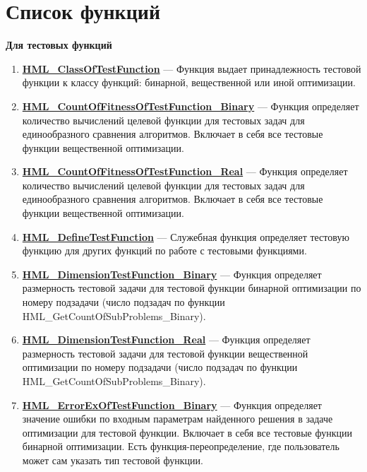\documentclass[a4paper,12pt]{article}
\begin{document}
\section{Список функций}\label{section_listfunctions}
\textbf{Для тестовых функций}
\begin{enumerate}

\item \textbf{\hyperref[HML_ClassOfTestFunction]{HML\_ClassOfTestFunction}} --- Функция выдает принадлежность тестовой функции к классу функций: бинарной, вещественной или иной оптимизации.

\item \textbf{\hyperref[HML_CountOfFitnessOfTestFunction_Binary]{HML\_CountOfFitnessOfTestFunction\_Binary}} --- Функция определяет количество вычислений целевой функции для тестовых задач для единообразного сравнения алгоритмов. Включает в себя все тестовые функции вещественной оптимизации.

\item \textbf{\hyperref[HML_CountOfFitnessOfTestFunction_Real]{HML\_CountOfFitnessOfTestFunction\_Real}} --- Функция определяет количество вычислений целевой функции для тестовых задач для единообразного сравнения алгоритмов. Включает в себя все тестовые функции вещественной оптимизации.

\item \textbf{\hyperref[HML_DefineTestFunction]{HML\_DefineTestFunction}} --- Служебная функция определяет тестовую функцию для других функций по работе с тестовыми функциями.

\item \textbf{\hyperref[HML_DimensionTestFunction_Binary]{HML\_DimensionTestFunction\_Binary}} --- Функция определяет размерность тестовой задачи для тестовой функции бинарной оптимизации по номеру подзадачи (число подзадач по функции HML\_GetCountOfSubProblems\_Binary).

\item \textbf{\hyperref[HML_DimensionTestFunction_Real]{HML\_DimensionTestFunction\_Real}} --- Функция определяет размерность тестовой задачи для тестовой функции вещественной оптимизации по номеру подзадачи (число подзадач по функции HML\_GetCountOfSubProblems\_Binary).

\item \textbf{\hyperref[HML_ErrorExOfTestFunction_Binary]{HML\_ErrorExOfTestFunction\_Binary}} --- Функция определяет значение ошибки по входным параметрам найденного решения в задаче оптимизации для тестовой функции. Включает в себя все тестовые функции бинарной оптимизации. Есть функция-переопределение, где пользователь может сам указать тип тестовой функции.


\end{enumerate}
\end{document}
